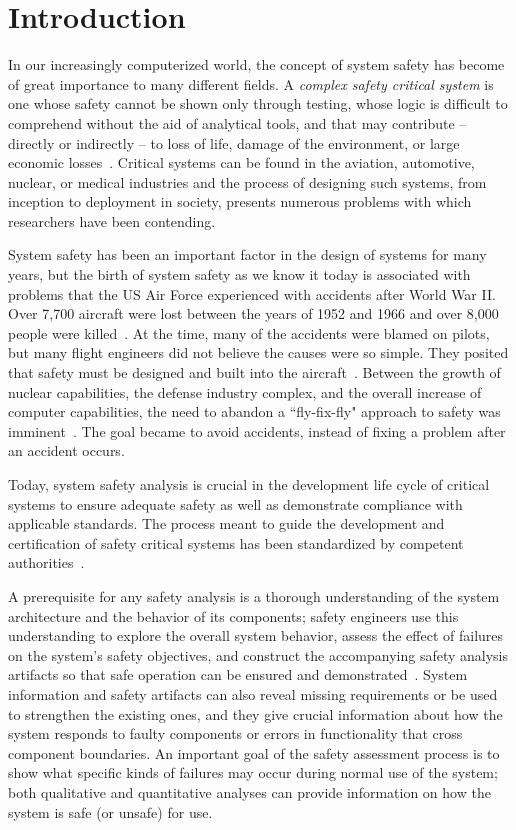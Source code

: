 \chapter{Introduction}
\label{chap:intro}
In our increasingly computerized world, the concept of system safety has become of great importance to many different fields. A \emph{complex safety critical system} is one whose safety cannot be shown only through testing, whose logic is difficult to comprehend without the aid of analytical tools, and that may contribute -- directly or indirectly -- to loss of life, damage of the environment, or large economic losses~\cite{SAE}. Critical systems can be found in the aviation, automotive, nuclear, or medical industries and the process of designing such systems, from inception to deployment in society, presents numerous problems with which researchers have been contending. 

System safety has been an important factor in the design of systems for many years, but the birth of system safety as we know it today is associated with problems that the US Air Force experienced with accidents after World War II. Over 7,700 aircraft were lost between the years of 1952 and 1966 and over 8,000 people were killed~\cite{hammer}. At the time, many of the accidents were blamed on pilots, but many flight engineers did not believe the causes were so simple. They posited that safety must be designed and built into the aircraft~\cite{levesonWhitePaper}. Between the growth of nuclear capabilities, the defense industry complex, and the overall increase of computer capabilities, the need to abandon a ``fly-fix-fly" approach to safety was imminent~\cite{miller1954applying, levesonWhitePaper, hammer}. The goal became to avoid accidents, instead of fixing a problem after an accident occurs.

Today, system safety analysis is crucial in the development life cycle of critical systems to ensure adequate safety as well as demonstrate compliance with applicable standards. The process meant to guide the development and certification of safety critical systems has been standardized by competent authorities~\cite{SAE,SAE:ARP4761,SAE:ARP4754A}.

A prerequisite for any safety analysis is a thorough understanding of the system architecture and the behavior of its components; safety engineers use this understanding to explore the overall system behavior, assess the effect of failures on the system's safety objectives, and construct the accompanying safety analysis artifacts so that safe operation can be ensured and demonstrated~\cite{SAE:ARP4761,SAE:ARP4754A}. System information and safety artifacts can also reveal missing requirements or be used to strengthen the existing ones, and they give crucial information about how the system responds to faulty components or errors in functionality that cross component boundaries.   An important goal of the safety assessment process is to show what specific kinds of failures may occur during normal use of the system; both qualitative and quantitative analyses can provide information on how the system is safe (or unsafe) for use.

